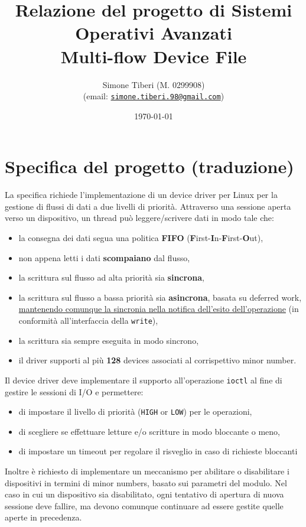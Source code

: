 \documentclass{article}
\title{\small Relazione del progetto di Sistemi Operativi Avanzati \\
\Huge \textbf{Multi-flow Device File}}
\author{Simone Tiberi (M. 0299908)\\%
(email: \texttt{\href{mailto:simone.tiberi.98@gmail.com}{simone.tiberi.98@gmail.com}})}
\date{\today}
\begin{document}
\maketitle

\section{Specifica del progetto (traduzione)}
La specifica richiede l'implementazione di un device driver per Linux per la gestione di flussi di dati a due livelli di priorità. Attraverso una sessione aperta verso un dispositivo, un thread può leggere/scrivere dati in modo tale che:
\begin{itemize}
        \item la consegna dei dati segua una politica \textbf{FIFO} (\textbf{F}irst-\textbf{I}n-\textbf{F}irst-\textbf{O}ut),
        \item non appena letti i dati \textbf{scompaiano} dal flusso,
        \item la scrittura sul flusso ad alta priorità sia \textbf{sincrona},
        \item la scrittura sul flusso a bassa priorità sia \textbf{asincrona}, basata su deferred work, \ul{mantenendo comunque la sincronia nella notifica dell'esito dell'operazione} (in conformità all'interfaccia della \texttt{write}),
        \item la scrittura sia sempre eseguita in modo sincrono,
        \item il driver supporti al più \textbf{128} devices associati al corrispettivo minor number.
\end{itemize}

Il device driver deve implementare il supporto all'operazione \texttt{ioctl} al fine di gestire le sessioni di I/O e permettere:
\begin{itemize}
        \item di impostare il livello di priorità (\texttt{HIGH} or \texttt{LOW}) per le operazioni,
        \item di scegliere se effettuare letture e/o scritture in modo bloccante o meno,
        \item di impostare un timeout per regolare il risveglio in caso di richieste bloccanti
\end{itemize}

Inoltre è richiesto di implementare un meccanismo per abilitare o disabilitare i dispositivi in termini di minor numbers, basato sui parametri del modulo. Nel caso in cui un dispositivo sia disabilitato, ogni tentativo di apertura di nuova sessione deve fallire, ma devono comunque continuare ad essere gestite quelle aperte in precedenza.
\end{document}
